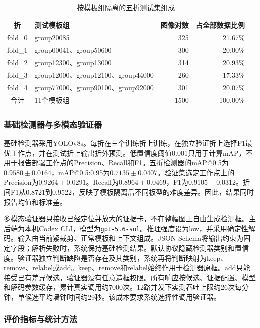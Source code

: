 \begin{table}[t]
  \centering
  \caption{按模板组隔离的五折测试集组成}
  \label{tab:fold_composition}
  \setlength{\tabcolsep}{5pt}
  \begin{tabular}{clrr}
    \hline
    折 & 测试模板组 & 图像对数 & 占全部数据比例 \\
    \hline
    fold\_0 & group20085 & 325 & 21.67\% \\
    fold\_1 & group00041、group50600 & 300 & 20.00\% \\
    fold\_2 & group12300、group13000 & 314 & 20.93\% \\
    fold\_3 & group12000、group12100、group44000 & 260 & 17.33\% \\
    fold\_4 & group77000、group90100、group92000 & 301 & 20.07\% \\
    \hline
    合计 & 11个模板组 & 1500 & 100.00\% \\
    \hline
  \end{tabular}
\end{table}

\subsubsection{基础检测器与多模态验证器}

基础检测器采用YOLOv8s。每折在三个训练折上训练，在独立验证折上选择F1最优工作点，并在测试折上输出折外预测。低置信度阈值0.001只用于计算mAP，不用于报告部署工作点的Precision、Recall和F1。五折检测器的mAP@0.5为$0.9580\pm0.0164$，mAP@0.5:0.95为$0.7135\pm0.0407$。验证集选定工作点上的Precision为$0.9264\pm0.0291$。Recall为$0.8964\pm0.0469$，F1为$0.9105\pm0.0312$。折间F1从0.8721到0.9522，反映了模板隔离后不同板型的难度差异。因此，结果同时报告均值和标准差。

多模态验证器只接收已经定位并放大的证据卡，不在整幅图上自由生成检测框。主后端为本机Codex CLI，模型为\texttt{gpt-5.6-sol}。推理强度设为low，并采用确定性解码。输入由当前紧裁剪、正常模板和上下文组成。JSON Schema将输出约束为固定字段；解析失败时，系统保持基础检测结果。默认协议隐藏检测器类别和置信度。验证器独立判断缺陷是否存在及其类别，系统再将判断映射为keep、remove、relabel或add。keep、remove和relabel始终作用于检测器原框。add只能接受已有差异候选，验证器没有任意造框权限。所有响应按候选、证据配置、模型和解码参数缓存，累计真实调用约7000次。12路并发下实测吞吐上限约26次每分钟，单候选平均墙钟时间约29秒。该成本要求系统选择性调用验证器。

\subsubsection{评价指标与统计方法}

